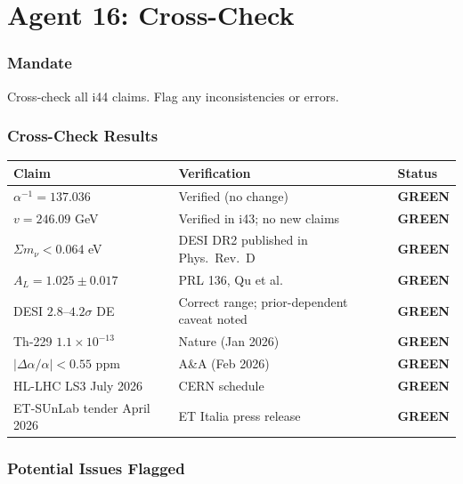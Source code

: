 \documentclass[11pt,a4paper]{article}
\newcommand{\GREEN}{\textcolor{dfdgreen}{\textbf{GREEN}}}
\begin{document}
\part{Agent 16: Cross-Check}
\label{part:agent16}

\section{Mandate}

Cross-check all i44 claims. Flag any inconsistencies or errors.

\section{Cross-Check Results}

\begin{center}
\begin{tabular}{lp{8cm}l}
\toprule
\textbf{Claim} & \textbf{Verification} & \textbf{Status} \\
\midrule
$\alpha^{-1} = 137.036$ & Verified (no change) & \GREEN \\
$v = 246.09$ GeV & Verified in i43; no new claims & \GREEN \\
$\Sigma m_\nu < 0.064$ eV & DESI DR2 published in Phys.\ Rev.\ D & \GREEN \\
$A_L = 1.025 \pm 0.017$ & PRL 136, Qu et al.\ & \GREEN \\
DESI $2.8$--$4.2\sigma$ DE & Correct range; prior-dependent caveat noted & \GREEN \\
Th-229 $1.1 \times 10^{-13}$ & Nature (Jan 2026) & \GREEN \\
$|\Delta\alpha/\alpha| < 0.55$ ppm & A\&A (Feb 2026) & \GREEN \\
HL-LHC LS3 July 2026 & CERN schedule & \GREEN \\
ET-SUnLab tender April 2026 & ET Italia press release & \GREEN \\
\bottomrule
\end{tabular}
\end{center}

\section{Potential Issues Flagged}
\end{document}
